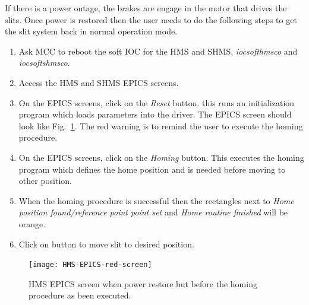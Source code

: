 If there is a power outage, the brakes are engage in the motor that drives the slits. Once power is restored then the user needs to do the
following steps to get the slit system back in normal operation mode.
\begin{enumerate}
\item Ask MCC to reboot the soft IOC for the HMS and SHMS, {\it  iocsofthmsco} and {\it iocsoftshmsco}.
\item Access the HMS and SHMS EPICS screens.
\item On the EPICS screens, click on the {\it Reset} button. this runs an initialization program which loads parameters into the driver. The EPICS screen should look like Fig.~\ref{fig:red-screen-epics}. The red warning is to remind the user to execute the homing procedure.
\item On the EPICS screens, click on the {\it Homing} button. This executes the homing program which defines the home position and is needed before moving to other position. 
\item When the homing procedure is successful then the rectangles next to {\it Home position found/reference point point set} and {\it Home routine finished} will be orange. 
\item Click on button to move slit to desired position.
\end{enumerate}
\begin{figure}
\texttt{[image: HMS-EPICS-red-screen]}
\caption{HMS EPICS screen when power restore but before the homing procedure as been executed. \label{fig:red-screen-epics}}
\end{figure}







